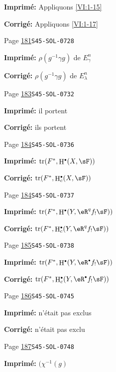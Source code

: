 \documentclass[oneside]{book}
\DeclareMathOperator{\h}{H}
\DeclareMathOperator{\tr}{tr}
\theoremstyle{sga-source}
\theoremstyle{sga-source-dash}
\theoremstyle{sga-source-dotdash}
\theoremstyle{sga-source-number-note-dash}
\theoremstyle{sga-source-note-number-dotdash}
\theoremstyle{sga-source-example-dotdash}
\theoremstyle{sga-source-inline-number}
\theoremstyle{sga-source-bare-number}
\theoremstyle{sga-source}
\let\oldbullet\bullet
\renewcommand{\bullet}{\textnormal{\tiny$\oldbullet$}}
\begin{document}
\begin{description}
\par\noindent\textbf{Imprimé:} Appliquons \ref{VI:1-15}
\par\noindent\textbf{Corrigé:} Appliquons \ref{VI:1-17}
\smallskip
\item[\hypertarget{apparatus:FR-0149}{149}] Page \hyperlink{printpage:fr:181}{181}\quad\texttt{S45-SOL-0728}
\par\noindent\textbf{Imprimé:} $\rho(g^{-1} \gamma g)$ de $E_\gamma^n$
\par\noindent\textbf{Corrigé:} $\rho(g^{-1} \gamma g)$ de $E_\lambda^n$
\smallskip
\item[\hypertarget{apparatus:FR-0150}{150}] Page \hyperlink{printpage:fr:183}{183}\quad\texttt{S45-SOL-0732}
\par\noindent\textbf{Imprimé:} il portent
\par\noindent\textbf{Corrigé:} ils portent
\smallskip
\item[\hypertarget{apparatus:FR-0151}{151}] Page \hyperlink{printpage:fr:184}{184}\quad\texttt{S45-SOL-0736}
\par\noindent\textbf{Imprimé:} \(\tr(F^\ast,\h^\bullet(X,\sF))\)
\par\noindent\textbf{Corrigé:} \(\tr(F^\ast,\h_c^\bullet(X,\sF))\)
\smallskip
\item[\hypertarget{apparatus:FR-0152}{152}] Page \hyperlink{printpage:fr:184}{184}\quad\texttt{S45-SOL-0737}
\par\noindent\textbf{Imprimé:} \(\tr(F^\ast, \h^\bullet(Y,\eR^q f_! \sF))\)
\par\noindent\textbf{Corrigé:} \(\tr(F^\ast,\h_c^\bullet(Y,\eR^q f_! \sF))\)
\smallskip
\item[\hypertarget{apparatus:FR-0153}{153}] Page \hyperlink{printpage:fr:185}{185}\quad\texttt{S45-SOL-0738}
\par\noindent\textbf{Imprimé:} \(\tr(F^\ast,\h^\bullet(Y,\eR^\bullet f_! \sF))\)
\par\noindent\textbf{Corrigé:} \(\tr(F^\ast,\h_c^\bullet(Y,\eR^\bullet f_! \sF))\)
\smallskip
\item[\hypertarget{apparatus:FR-0154}{154}] Page \hyperlink{printpage:fr:186}{186}\quad\texttt{S45-SOL-0745}
\par\noindent\textbf{Imprimé:} n'était pas exclus
\par\noindent\textbf{Corrigé:} n'était pas exclu
\smallskip
\item[\hypertarget{apparatus:FR-0155}{155}] Page \hyperlink{printpage:fr:187}{187}\quad\texttt{S45-SOL-0748}
\par\noindent\textbf{Imprimé:} \((\chi^{-1}(g)\)

\end{description}
\end{document}
